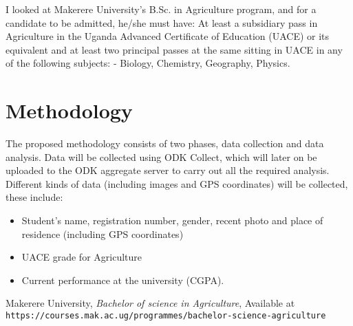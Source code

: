 \documentclass[options]{article}
\begin{document}
I looked at \cite{latexGuide}Makerere University's B.Sc. in Agriculture program, and for a candidate to be admitted, he/she must have: At least a subsidiary pass in Agriculture in the Uganda Advanced Certificate of Education (UACE) or its equivalent and at least two principal passes at the same sitting in UACE in any of the following subjects: - Biology,
Chemistry, Geography, Physics.


\section{\textbf{Methodology}}
The proposed methodology consists of two phases, data collection and data analysis.\bigbreak
Data will be collected using ODK Collect, which will later on be uploaded to the ODK aggregate server to carry out all the required analysis. Different kinds of data (including images and GPS coordinates) will be collected, these include: 

\begin{itemize}
  \item Student’s name, registration number, gender, recent photo and place of residence (including GPS coordinates)
  \item UACE grade for Agriculture
  \item Current performance at the university (CGPA). 
\end{itemize}



\begin{thebibliography}{10}  Makerere University, \emph{Bachelor of science in Agriculture}, Available at \texttt{https://courses.mak.ac.ug/programmes/bachelor-science-agriculture} \end{thebibliography}
\end{document}
